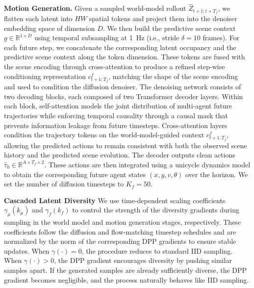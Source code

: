 \documentclass[runningheads]{llncs}
\begin{document}
\textbf{Motion Generation.} Given a sampled world-model rollout $\hat Z_{t+1:t+T_f}$, we flatten each latent into $HW$ spatial tokens and project them into the denoiser embedding space of dimension $D$. We then build the predictive scene context $g \in \mathbb{R}^{1 \times D}$ using temporal subsampling at 1~Hz (i.e., stride $\delta=10$ frames). For each future step, we concatenate the corresponding latent occupancy and the predictive scene context along the token dimension. These tokens are fused with the scene encoding through cross-attention to produce a refined step-wise conditioning representation $c_{t+1:T_f}^f$, matching the shape of the scene encoding and used to condition the diffusion denoiser. The denoising network consists of two decoding blocks, each composed of two Transformer decoder layers. Within each block, self-attention models the joint distribution of multi-agent future trajectories while enforcing temporal causality through a causal mask \cite{huang2024dtpp} that prevents information leakage from future timesteps. Cross-attention layers condition the trajectory tokens on the world-model-guided context $c_{t+1:T_f}^f$, allowing the predicted actions to remain consistent with both the observed scene history and the predicted scene evolution. The decoder outputs clean actions $\hat{\tau}_0 \in \mathbb{R}^{A \times T_f \times 2}$. These actions are then integrated using a unicycle dynamics model to obtain the corresponding future agent states $(x, y, v, \theta)$ over the horizon. We set the number of diffusion timesteps to $K_f = 50$.

\textbf{Cascaded Latent Diversity} We use time-dependent scaling coefficients $\gamma_\mu(k_\mu)$ and $\gamma_f(k_f)$ to control the strength of the diversity gradients during sampling in the world model and motion generation stages, respectively. These coefficients follow the diffusion and flow-matching timestep schedules and are normalized by the norm of the corresponding DPP gradients to ensure stable updates. When $\gamma(\cdot)=0$, the procedure reduces to standard IID sampling. When $\gamma(\cdot)>0$, the DPP gradient encourages diversity by pushing similar samples apart. If the generated samples are already sufficiently diverse, the DPP gradient becomes negligible, and the process naturally behaves like IID sampling.
\end{document}
